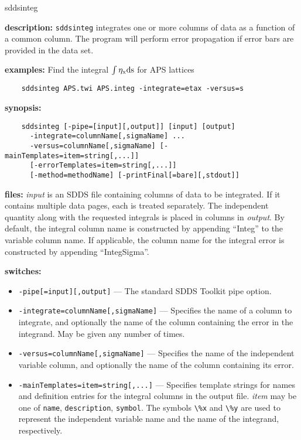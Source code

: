 \begin{sddsprog}{sddsinteg}
  \item \textbf{description:} \verb|sddsinteg| integrates one or more columns of data as a function of a common column. The program will perform error propagation if error bars are provided in the data set.
  \item \textbf{examples:}
    Find the integral ${\rm \int \eta_x ds}$ for APS lattices
    \begin{verbatim}
    sddsinteg APS.twi APS.integ -integrate=etax -versus=s
    \end{verbatim}
  \item \textbf{synopsis:}
    \begin{verbatim}
    sddsinteg [-pipe=[input][,output]] [input] [output]
      -integrate=columnName[,sigmaName] ...
      -versus=columnName[,sigmaName] [-mainTemplates=item=string[,...]]
      [-errorTemplates=item=string[,...]]
      [-method=methodName] [-printFinal[=bare][,stdout]]
    \end{verbatim}
  \item \textbf{files:}
    {\em input} is an SDDS file containing columns of data to be integrated. If it contains multiple data pages, each is treated separately. The independent quantity along with the requested integrals is placed in columns in {\em output}. By default, the integral column name is constructed by appending ``Integ'' to the variable column name. If applicable, the column name for the integral error is constructed by appending ``IntegSigma''.
  \item \textbf{switches:}
    \begin{itemize}
      \item \verb|-pipe[=input][,output]| --- The standard SDDS Toolkit pipe option.
      \item \verb|-integrate=columnName[,sigmaName]| --- Specifies the name of a column to integrate, and optionally the name of the column containing the error in the integrand. May be given any number of times.
      \item \verb|-versus=columnName[,sigmaName]| --- Specifies the name of the independent variable column, and optionally the name of the column containing its error.
      \item \verb|-mainTemplates=item=string[,...]| --- Specifies template strings for names and definition entries for the integral columns in the output file. {\em item} may be one of \verb|name|, \verb|description|, \verb|symbol|. The symbols \verb|\%x| and \verb|\%y| are used to represent the independent variable name and the name of the integrand, respectively.

\end{itemize}
\end{sddsprog}
